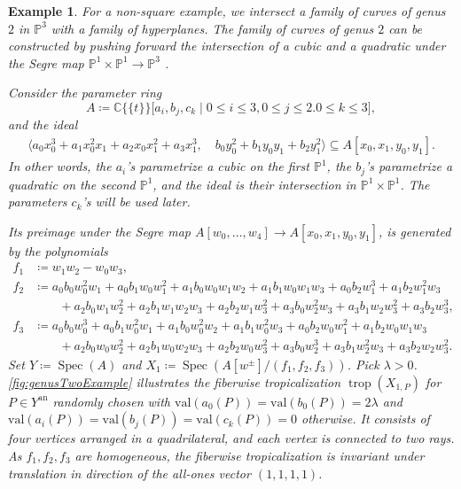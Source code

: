 \documentclass[12pt,reqno,a4paper]{amsart}
\theoremstyle{theoremstyle}
\theoremstyle{examplestyle}
\newtheorem{example}[theorem]{Example}
\theoremstyle{algorithmstyle}
\newcommand{\CC}{\mathbb{C}}
\newcommand{\PP}{\mathbb{P}}
\newcommand{\an}{{\mathrm{an}}}
\DeclareMathOperator{\Spec}{Spec}
\DeclareMathOperator{\Trop}{trop}
\begin{document}
\begin{example}
  \label{ex:genusTwoExample}
  \label{ex:nonSquare}
  For a non-square example, we intersect a family of curves of genus $2$ in $\mathbb{P}^3$ with a family of hyperplanes.  The family of curves of genus $2$ can be constructed by pushing forward the intersection of a cubic and a quadratic under the Segre map $\mathbb{P}^{1}\times \mathbb{P}^{1}\to \mathbb{P}^{3}$ \cite[Section IV, Remark 6.4.1(c))]{Hartshorne1977}.

  Consider the parameter ring
  \begin{equation*}
    A\coloneqq \CC\{\!\{t\}\!\}\Big[a_{i},b_{j},c_{k}\mid 0\leq{i}\leq{3}, 0\leq{j}\leq{2}. 0\leq k\leq 3\Big],
  \end{equation*}
  and the ideal
  \begin{align*}
    \langle a_{0}x_{0}^{3}+a_{1}x_{0}^2x_{1}+a_{2}x_{0}x_{1}^{2}+a_{3}x_{1}^3 ,\quad b_{0}y_{0}^2+b_{1}y_{0}y_{1}+b_{2}y_{1}^2 \rangle \subseteq A[x_{0},x_{1},y_{0},y_{1}].
  \end{align*}
  In other words, the $a_i$'s parametrize a cubic on the first $\PP^1$, the $b_j$'s parametrize a quadratic on the second $\PP^1$, and the ideal is their intersection in $\mathbb{P}^{1}\times \mathbb{P}^{1}$.  The parameters $c_k$'s will be used later.

  Its preimage under the Segre map $A[w_{0},\dots,w_{4}]\to A[x_{0},x_{1},y_{0},y_{1}]$, is generated by the polynomials
  \begin{align*}
    f_{1}&\coloneqq w_{1}w_{2}-w_{0}w_{3},\\
    f_{2}&\coloneqq a_{0}b_{0}w_{0}^2w_{1} + a_{0}b_{1}w_{0}w_{1}^2 + a_{1}b_{0}w_{0}w_{1}w_{2} + a_{1}b_{1}w_{0}w_{1}w_{3}+ a_{0}b_{2}w_{1}^3 + a_{1}b_{2}w_{1}^2w_{3}\\
         & \qquad + a_{2}b_{0}w_{1}w_{2}^2 + a_{2}b_{1}w_{1}w_{2}w_{3} + a_{2}b_{2}w_{1}w_{3}^2 + a_{3}b_{0}w_{2}^2w_{3} + a_{3}b_{1}w_{2}w_{3}^2 + a_{3}b_{2}w_{3}^3,\\
    f_{3}&\coloneqq a_{0}b_{0}w_{0}^3 + a_{0}b_{1}w_{0}^2w_{1} + a_{1}b_{0}w_{0}^2w_{2} + a_{1}b_{1}w_{0}^2w_{3} + a_{0}b_{2}w_{0}w_{1}^2 + a_{1}b_{2}w_{0}w_{1}w_{3} \\
    &\qquad + a_{2}b_{0}w_{0}w_{2}^2 + a_{2}b_{1}  w_{0}w_{2}w_{3} + a_{2}b_{2}w_{0}w_{3}^2 + a_{3}b_{0}w_{2}^3 + a_{3}b_{1}w_{2}^2w_{3} + a_{3}b_{2}w_{2}w_{3}^2.
  \end{align*}
  Set $Y\coloneqq\Spec(A)$ and $X_1\coloneqq\Spec(A[w^\pm]/(f_1,f_2,f_3))$.  Pick $\lambda>0$.  \cref{fig:genusTwoExample} illustrates the fiberwise tropicalization $\Trop(X_{1,P})$ for $P\in Y^{\an}$ randomly chosen with $\mathrm{val}(a_0(P))=\mathrm{val}(b_0(P))=2\lambda$ and $\mathrm{val}(a_i(P))=\mathrm{val}(b_j(P))=\mathrm{val}(c_k(P))=0$ otherwise.  It consists of four vertices arranged in a quadrilateral, and each vertex is connected to two rays.  As $f_1,f_2,f_3$ are homogeneous, the fiberwise tropicalization is invariant under translation in direction of the all-ones vector $(1,1,1,1)$.


\end{example}
\end{document}
